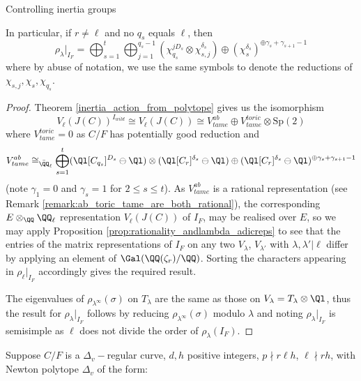 \documentclass[11pt,a4paper]{article}
\newcommand{\Dv}{\Delta_v}
\newcommand{\Qr}{{\QQ(\zeta_r)}}
\begin{document}
\begin{section}{Controlling inertia groups}
\begin{corollary}
In particular, if $r \neq \ell$ and no $q_s$ equals $\ell$, then
$$\rho_\lambda|_{I_F} = \bigoplus^t_{s=1}  \bigoplus^{q_s-1}_{j=1}(\chi_{q_s}^{j D_s} \otimes \chi_{s,j}^{\delta_s})   \oplus (\chi_s^{\delta_s})^{\oplus \gamma_s + \gamma_{s+1} -1}$$
where by abuse of notation, we use the same symbols to denote the reductions of $\chi_{s,j}, \chi_s, \chi_{q_s}$.
\end{corollary}

\begin{proof}
Theorem \ref{inertia_action_from_polytope} gives us the isomorphism
\[ V_\ell(J(C))^{I_{wild}} \cong V_\ell(J(C)) \cong V^{ab}_{tame}\oplus  V^{toric}_{tame} \otimes \mathrm{Sp}(2)
\]
where $V^{toric}_{tame}=0$ as $C/F$ has potentially good reduction and
\[ V^{ab}_{tame}   \cong_{\Bar{\QQ}_\ell} \bigoplus^t_{s=1}  (\Ql[C_{q_s}]^{D_s} \ominus \Ql )\otimes (\Ql[C_{r}]^{\delta_s}  \ominus \Ql) \oplus (\Ql[C_{r}]^{\delta_s} \ominus \Ql)^{\oplus \gamma_s + \gamma_{s+1} -1}
\]
(note $\gamma_1=0$ and $\gamma_s=1$ for $2\leq s \leq t$).
As $V_{tame}^{ab}$ is a rational representation (see Remark \ref{remark:ab_toric_tame_are_both_rational}), the corresponding $E \otimes _\QQ \QQ_\ell$ representation $V_\ell(J(C))$ of $I_F$, may be realised over $E$, so we may apply Proposition \ref{prop:rationality_andlambda_adicreps} to see that the entries of the matrix representations of $I_F$ on any two $V_\lambda$, $V_{\lambda'}$ with $\lambda, \lambda'|\ell$ differ by applying an element of $\Gal(\Qr/\QQ)$.
Sorting the characters appearing in $\rho_\ell|_{I_F}$ accordingly gives the required result.


The eigenvalues of $\rho_{\lambda^\infty}(\sigma)$ on $T_\lambda$ are the same as those on $V_\lambda = T_\lambda \otimes \Ql$, thus the result for $\rho_\lambda|_{I_F}$ follows by reducing $\rho_{\lambda^\infty}(\sigma)$ modulo $\lambda$ and noting $\rho_{\lambda}|_{I_F}$ is semisimple as $\ell$ does not divide the order of $\rho_\lambda(I_F)$.
\end{proof}


\begin{proposition}
\label{prop_transvection_creation}
Suppose $C/F$ is a $\Delta_v-$regular curve, $d,h$ positive integers, $p \nmid r\ell h$, $\ell\nmid rh$, with Newton polytope $\Dv$ of the form:
\begin{center}
\end{center}
\end{proposition}
\end{section}
\end{document}
